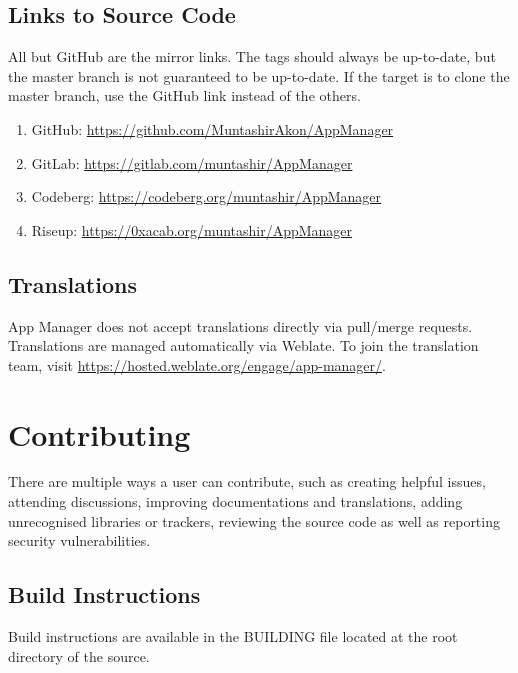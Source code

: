 \subsection{Links to Source Code}\label{subsec:links-to-source-code} %
All but GitHub are the mirror links. The tags should always be up-to-date, but the master branch is not guaranteed to be
up-to-date. If the target is to clone the master branch, use the GitHub link instead of the others.
\begin{enumerate}
    \item GitHub: \url{https://github.com/MuntashirAkon/AppManager}
    \item GitLab: \url{https://gitlab.com/muntashir/AppManager}
    \item Codeberg: \url{https://codeberg.org/muntashir/AppManager}
    \item Riseup: \url{https://0xacab.org/muntashir/AppManager}
\end{enumerate}

\subsection{Translations}\label{subsec:translations} %
App Manager does not accept translations directly via pull/merge requests. Translations are managed automatically via
Weblate. To join the translation team, visit \url{https://hosted.weblate.org/engage/app-manager/}.


\section{Contributing}\label{sec:contributing} %
There are multiple ways a user can contribute, such as creating helpful issues, attending discussions, improving
documentations and translations, adding unrecognised libraries or trackers, reviewing the source code as well as
reporting security vulnerabilities.

\subsection{Build Instructions}\label{subsec:build-instructions} %
Build instructions are available in the BUILDING file located at the root directory of the source.

